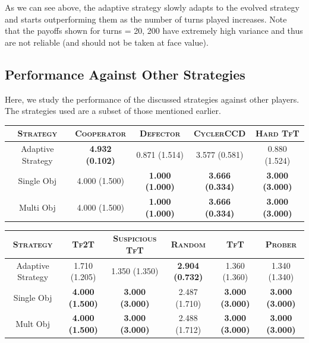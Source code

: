 \documentclass[a4paper]{article}
\begin{document}
	As we can see above, the adaptive strategy slowly adapts to the evolved strategy and starts outperforming them as the number of turns played increases. Note that the payoffs shown for turns = 20, 200 have extremely high variance and thus are not reliable (and should not be taken at face value).
	
	\subsection{Performance Against Other Strategies}
	
	Here, we study the performance of the discussed strategies against other players. The strategies used are a subset of those mentioned earlier.	
	
	\renewcommand{\tabcolsep}{8pt}

	\begin{table}[H]
	  \begin{center}
	    \begin{tabular}{|c|c|c|c|c|}
	      \toprule
	 	  \textsc{Strategy} & \textsc{Cooperator} & \textsc{Defector} & \textsc{CyclerCCD} & \textsc{Hard TfT}\\
		  \midrule
		  Adaptive Strategy & \textbf{4.932} \textbf{(0.102)} & 0.871 (1.514) & 3.577 (0.581) & 0.880 (1.524)\\
		  Single Obj & 4.000 (1.500) & \textbf{1.000 (1.000)} & \textbf{3.666 (0.334)} & \textbf{3.000 (3.000)}\\
		  Multi Obj & 4.000 (1.500) & \textbf{1.000 (1.000)} &  \textbf{3.666 (0.334)} & \textbf{3.000 (3.000)}\\
		\bottomrule
	    \end{tabular}
	  \end{center}
	\end{table}  		

	\vspace{-8mm}	
	\renewcommand{\tabcolsep}{6pt}

	\begin{table}[H]
	  \begin{center}
	  	\footnotesize
	    \begin{tabular}{|c|c|c|c|c|c|}
	      \toprule
	 	  \textsc{Strategy} & \textsc{Tf2T} & {\footnotesize{\textsc{Suspicious TfT}}} & \textsc{Random} & \textsc{TfT} & \textsc{Prober}\\
		  \midrule
		  Adaptive Strategy & 1.710 {(1.205)} & 1.350 (1.350) & \textbf{2.904 (0.732)} & 1.360 (1.360) & 1.340 (1.340)\\
		  Single Obj & \textbf{4.000} \textbf{(1.500)} & \textbf{3.000 (3.000)} & 2.487 (1.710) & \textbf{3.000 (3.000)} & \textbf{3.000 (3.000)}\\
		  Mult Obj & \textbf{4.000} \textbf{(1.500)} & \textbf{3.000 (3.000)} & 2.488 (1.712) & \textbf{3.000 (3.000)} & \textbf{3.000 (3.000)}\\
		  \bottomrule
	    \end{tabular}
	  \end{center}
	\end{table}  		
	\vspace{-3mm}	
\end{document}
